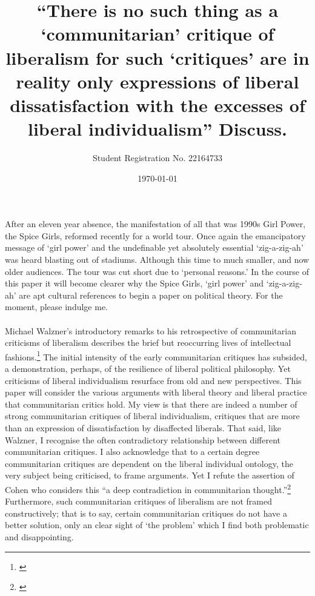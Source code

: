 \documentclass[12pt,a4paper,titlepage]{article}
\title{``There is no such thing as a `communitarian' critique of liberalism for such `critiques' are in reality only expressions of liberal dissatisfaction with the excesses of liberal individualism'' Discuss.}
\author{Student Registration No. 22164733}
\date{\today}
\begin{document}

\maketitle
\doublespacing
\paragraph{}After an eleven year absence, the manifestation of all that was 1990s Girl Power, the Spice Girls, reformed recently for a world tour. Once again the emancipatory message of `girl power' and the undefinable yet absolutely essential `zig-a-zig-ah' was heard blasting out of stadiums. Although this time to much smaller, and now older audiences. The tour was cut short due to `personal reasons.' In the course of this paper it will become clearer why the Spice Girls, `girl power' and `zig-a-zig-ah' are apt cultural references to begin a paper on political theory. For the moment, please indulge me.

\paragraph{}Michael Walzner's introductory remarks to his retrospective of communitarian criticisms of liberalism describes the brief but reoccurring lives of intellectual fashions.\footnote{\cite[p. 6]{walzer:1990cc}} The initial intensity of the early communitarian critiques has subsided, a demonstration, perhaps, of the resilience of liberal political philosophy. Yet criticisms of liberal individualism resurface from old and new perspectives. This paper will consider the various arguments with liberal theory and liberal practice that communitarian critics hold. My view is that there are indeed a number of strong communitarian critiques of liberal individualism, critiques that are more than an expression of dissatisfaction by disaffected liberals. That said, like Walzner, I recognise the often contradictory relationship between different communitarian critiques. I also acknowledge that to a certain degree communitarian critiques are dependent on the liberal individual ontology, the very subject being criticised, to frame arguments. Yet I refute the assertion of Cohen who considers this ``a deep contradiction in communitarian thought.''\footnote{\cite[p. 283]{cohen:2000cr}} Furthermore, such communitarian critiques of liberalism are not framed constructively; that is to say, certain communitarian critiques do not have a better solution, only an clear sight of `the problem' which I find both problematic and disappointing.
\end{document}
